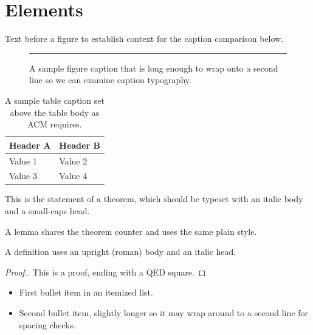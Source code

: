 \documentclass[acmsmall,nonacm]{acmart}
\begin{document}
\thispagestyle{empty}%

\section{Elements}
Text before a figure to establish context for the caption comparison below.

\begin{figure}[h]
\centering
\rule{4cm}{2cm}
\caption{A sample figure caption that is long enough to wrap onto a second line so we can examine caption typography.}
\label{fig:sample}
\end{figure}

\begin{table}[h]
\caption{A sample table caption set above the table body as ACM requires.}
\label{tab:sample}
\begin{tabular}{ll}
\toprule
Header A & Header B \\
\midrule
Value 1 & Value 2 \\
Value 3 & Value 4 \\
\bottomrule
\end{tabular}
\end{table}

\begin{theorem}\label{thm:main}
This is the statement of a theorem, which should be typeset with an italic body and a small-caps head.
\end{theorem}

\begin{lemma}
A lemma shares the theorem counter and uses the same plain style.
\end{lemma}

\begin{definition}
A definition uses an upright (roman) body and an italic head.
\end{definition}

\begin{proof}[Proof.]
This is a proof, ending with a QED square.
\end{proof}

\begin{itemize}
\item First bullet item in an itemized list.
\item Second bullet item, slightly longer so it may wrap around to a second line for spacing checks.
\end{itemize}
\end{document}
